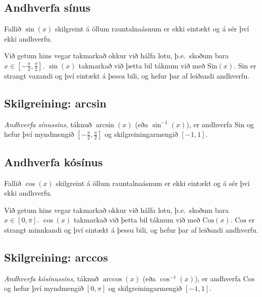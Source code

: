 \documentclass[b5paper,11pt,icelandic]{sphinxmanual}
\begin{document}
\subsection{Andhverfa sínus}
\label{kafli04:andhverfa-sinus}
Fallið \(\sin(x)\) skilgreint á öllum rauntalnaásnum er ekki eintækt
og á sér því ekki andhverfu.

Við getum hins vegar takmarkað okkur við hálfa lotu, þ.e. skoðum bara
\(x\in [-\frac \pi 2, \frac \pi 2]\). \(\sin(x)\) takmarkað við
þetta bil táknum við með \({{\text{Sin}}}(x)\).
\({{\text{Sin}}}\) er strangt vaxandi og því eintækt á þessu bili,
og hefur þar af leiðandi andhverfu.


\subsection{Skilgreining: arcsin}
\label{kafli04:skilgreining-arcsin}
\emph{Andhverfa sínussins}, táknuð \(\arcsin(x)\) (eða
\(\sin^{-1}(x)\)), er andhverfa \({{\text{Sin}}}\) og hefur því
myndmengið \([-\frac \pi 2,
\frac \pi 2]\) og skilgreiningarmengið \([-1,1]\).



\subsection{Andhverfa kósínus}
\label{kafli04:andhverfa-kosinus}
Fallið \(\cos(x)\) skilgreint á öllum rauntalnaásnum er ekki eintækt
og á sér því ekki andhverfu.

Við getum hins vegar takmarkað okkur við hálfa lotu, þ.e. skoðum bara
\(x\in [0, \pi]\). \(\cos(x)\) takmarkað við þetta bil táknum
við með \({{\text{Cos}}}(x)\). \({{\text{Cos}}}\) er strangt
minnkandi og því eintækt á þessu bili, og hefur þar af leiðandi
andhverfu.


\subsection{Skilgreining: arccos}
\label{kafli04:skilgreining-arccos}
\emph{Andhverfa kósínussins}, táknuð \(\arccos(x)\) (eða
\(\cos^{-1}(x)\)), er andhverfa \({{\text{Cos}}}\) og hefur því
myndmengið \([0,\pi]\) og skilgreiningarmengið \([-1,1]\).

\end{document}
